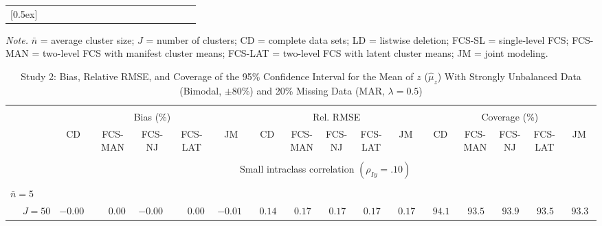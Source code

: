 \begin{sidewaystable}
\begin{threeparttable}
\begin{tabular}{llccccccccccccccc}
[0.5ex]\hline\\[-1.6ex] 
\end{tabular}
\begin{tablenotes}{\footnotesize \textit{Note.} $\bar{n}$ = average cluster size; $J$ = number of clusters; CD = complete data sets; LD = listwise deletion; FCS-SL = single-level FCS; FCS-MAN = two-level FCS with manifest cluster means; FCS-LAT = two-level FCS with latent cluster means; JM = joint modeling.}\end{tablenotes}
\end{threeparttable}
\end{sidewaystable}
\begin{sidewaystable}
\begin{threeparttable}
\setlength{\tabcolsep}{1.0pt}
\renewcommand{\arraystretch}{0.95}
\footnotesize
\caption{\small Study 2: Bias, Relative RMSE, and Coverage of the 95\% Confidence Interval for the Mean of $z$ ($\hat\mu_z$) With Strongly Unbalanced Data (Bimodal, $\pm 80\%$) and 20\% Missing Data (MAR, $\lambda=0.5$)}
\begin{tabular}{llccccccccccccccc}
\hline\\[-1.8ex]
& & \multicolumn{5}{c}{Bias (\%)} & \multicolumn{5}{c}{Rel. RMSE} & \multicolumn{5}{c}{Coverage (\%)} \\ \cmidrule(r){3-7}\cmidrule(r){8-12}\cmidrule(r){13-17}
 &  & CD & \makecell{FCS-\\MAN} & \makecell{FCS-\\NJ} & \makecell{FCS-\\LAT} & JM & CD & \makecell{FCS-\\MAN} & \makecell{FCS-\\NJ} & \makecell{FCS-\\LAT} & JM & CD & \makecell{FCS-\\MAN} & \makecell{FCS-\\NJ} & \makecell{FCS-\\LAT} & \multicolumn{1}{c}{JM} \\ 
[0.4ex]\hline\\[-1.8ex]
& & \multicolumn{15}{c}{Small intraclass correlation $(\rho_{Iy}=.10)$} \\[0.6ex]\hline\\[-1.8ex]
\multicolumn{4}{l}{$\bar{n}=5$} \\  & \nopagebreak $\;J=50$  & ${-}0.00\phantom{0}$ & $\phantom{-}0.00\phantom{0}$ & ${-}0.00\phantom{0}$ & $\phantom{-}0.00\phantom{0}$ & ${-}0.01\phantom{0}$ & $\phantom{0}0.14\phantom{0}$ & $\phantom{0}0.17\phantom{0}$ & $\phantom{0}0.17\phantom{0}$ & $\phantom{0}0.17\phantom{0}$ & $\phantom{0}0.17\phantom{0}$ & $\phantom{0}94.1\phantom{0}$ & $\phantom{0}93.5\phantom{0}$ & $\phantom{0}93.9\phantom{0}$ & $\phantom{0}93.5\phantom{0}$ & $\phantom{0}93.3\phantom{0}$ \\

\end{tabular}
\end{threeparttable}
\end{sidewaystable}
